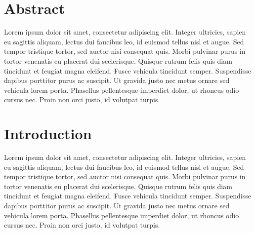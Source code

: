 \documentclass[letterpaper,11pt,oneside]{memoir} %
\begin{document}
\cleardoublepage

\chapter*{Abstract}
Lorem ipsum dolor sit amet, consectetur adipiscing elit. Integer ultricies,
sapien eu sagittis aliquam, lectus dui faucibus leo, id euismod tellus nisl et
augue. Sed tempor tristique tortor, sed auctor nisi consequat quis. Morbi
pulvinar purus in tortor venenatis eu placerat dui scelerisque. Quisque rutrum
felis quis diam tincidunt et feugiat magna eleifend. Fusce vehicula tincidunt
semper. Suspendisse dapibus porttitor purus ac suscipit. Ut gravida justo nec
metus ornare sed vehicula lorem porta. Phasellus pellentesque imperdiet dolor,
ut rhoncus odio cursus nec. Proin non orci justo, id volutpat turpis.

\cleardoublepage

\tableofcontents

\cleardoublepage


\chapter{Introduction}

Lorem ipsum dolor sit amet, consectetur adipiscing elit. Integer ultricies,
sapien eu sagittis aliquam, lectus dui faucibus leo, id euismod tellus nisl et
augue. Sed tempor tristique tortor, sed auctor nisi consequat quis. Morbi
pulvinar purus in tortor venenatis eu placerat dui scelerisque. Quisque rutrum
felis quis diam tincidunt et feugiat magna eleifend. Fusce vehicula tincidunt
semper. Suspendisse dapibus porttitor purus ac suscipit. Ut gravida justo nec
metus ornare sed vehicula lorem porta. Phasellus pellentesque imperdiet dolor,
ut rhoncus odio cursus nec. Proin non orci justo, id volutpat turpis.

% 
\end{document}
